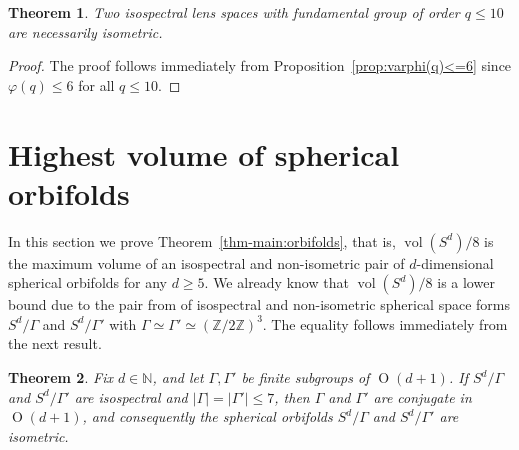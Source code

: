 \documentclass[12pt,a4paper,final]{amsart}
\theoremstyle{plain}
\newtheorem{theorem}{Theorem}[section]
\theoremstyle{definition}
\theoremstyle{remark}
\numberwithin{equation}{section}
\newcommand{\N}{\mathbb N}
\newcommand{\Z}{\mathbb Z}
\DeclareMathOperator{\Ot}{O}
\DeclareMathOperator{\vol}{vol}
\begin{document}
\begin{theorem}\label{thm:q<10}
Two isospectral lens spaces with fundamental group of order $q\leq 10$ are necessarily isometric. 
\end{theorem}

\begin{proof}
The proof follows immediately from Proposition~\ref{prop:varphi(q)<=6} since $\varphi(q)\leq 6$ for all $q\leq 10$. 
\end{proof}











\section{Highest volume of spherical orbifolds}
\label{sec:orbifolds}
In this section we prove Theorem~\ref{thm-main:orbifolds}, that is, $\vol(S^d)/8$ is the maximum volume of an isospectral and non-isometric pair of $d$-dimensional spherical orbifolds for any $d\geq5$. 
We already know that $\vol(S^d)/8$ is a lower bound due to the pair from \cite{LauretLinowitz} of isospectral and non-isometric spherical space forms $S^d/\Gamma$ and $S^d/\Gamma'$ with $\Gamma\simeq\Gamma'\simeq (\Z/2\Z)^3$. 
The equality follows immediately from the next result. 

\begin{theorem}\label{thm:orbifolds<8}
Fix $d\in\N$, and let $\Gamma,\Gamma'$ be finite subgroups of $\Ot(d+1)$. 
If $S^d/\Gamma$ and $S^d/\Gamma'$ are isospectral and  $|\Gamma|=|\Gamma'|\leq7$, then $\Gamma$ and $\Gamma'$ are conjugate in $\Ot(d+1)$, and consequently the spherical orbifolds $S^d/\Gamma$ and $S^d/\Gamma'$ are isometric. 
\end{theorem}
\end{document}
